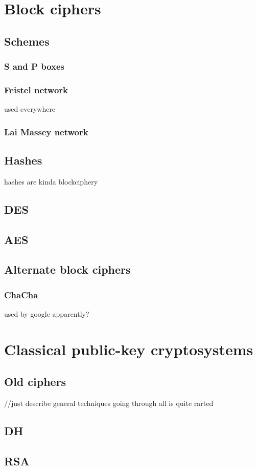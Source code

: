 \documentclass{report}
\begin{document}
\part{Block ciphers}
\chapter{Schemes}
\section{S and P boxes}
\section{Feistel network}
used everywhere
\section{Lai Massey network}
\chapter{Hashes}
hashes are kinda blockciphery
\chapter{DES}
\chapter{AES}
\chapter{Alternate block ciphers}
\section{ChaCha}
used by google apparently?
\part{Classical public-key cryptosystems}
\chapter{Old ciphers}
//just describe general techniques going through all is quite rarted
\chapter{DH}
\chapter{RSA}
\end{document}
